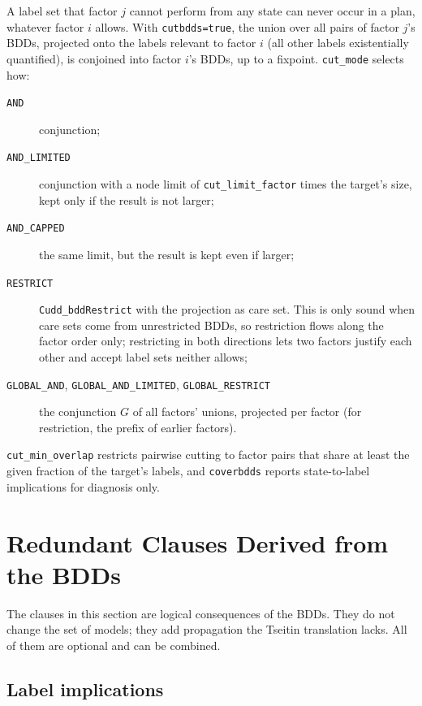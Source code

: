 \documentclass[manuscript, screen]{jair}
\newcommand{\opt}[1]{\texttt{#1}}
\begin{document}
A label set that factor $j$ cannot perform from any state can never occur in a plan, whatever factor
$i$ allows. With \opt{cutbdds=true}, the union over all pairs of factor $j$'s BDDs, projected onto the
labels relevant to factor $i$ (all other labels existentially quantified), is conjoined into factor
$i$'s BDDs, up to a fixpoint. \opt{cut\_mode} selects how:
\begin{description}
  \item[\opt{AND}] conjunction;
  \item[\opt{AND\_LIMITED}] conjunction with a node limit of \opt{cut\_limit\_factor} times the target's
        size, kept only if the result is not larger;
  \item[\opt{AND\_CAPPED}] the same limit, but the result is kept even if larger;
  \item[\opt{RESTRICT}] \texttt{Cudd\_bddRestrict} with the projection as care set. This is only sound
        when care sets come from unrestricted BDDs, so restriction flows along the factor order only;
        restricting in both directions lets two factors justify each other and accept label sets
        neither allows;
  \item[\opt{GLOBAL\_AND}, \opt{GLOBAL\_AND\_LIMITED}, \opt{GLOBAL\_RESTRICT}] the conjunction $G$ of
        all factors' unions, projected per factor (for restriction, the prefix of earlier factors).
\end{description}
\opt{cut\_min\_overlap} restricts pairwise cutting to factor pairs that share at least the given
fraction of the target's labels, and \opt{coverbdds} reports state-to-label implications for
diagnosis only.

\section{Redundant Clauses Derived from the BDDs}\label{sec:redundant}

The clauses in this section are logical consequences of the BDDs. They do not change the set of
models; they add propagation the Tseitin translation lacks. All of them are optional and can be
combined.

\subsection{Label implications}
\end{document}
